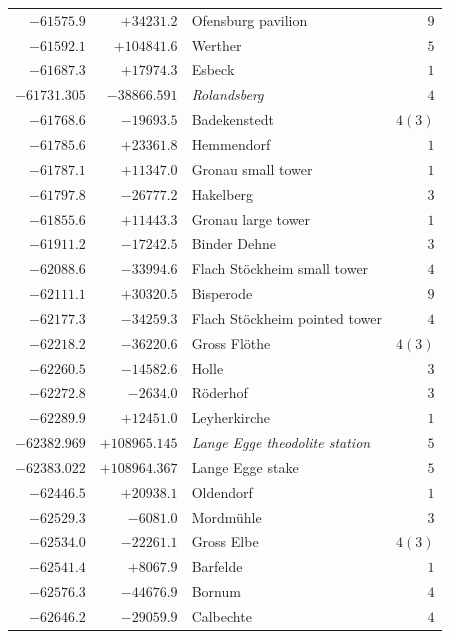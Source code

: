 \begin{center}
\begin{tabular}{r|r|p{170pt}|r}
\(-61575.9\)&\(+34231.2\)&Ofensburg pavilion&\(9\)\\
\(-61592.1\)&\(+104841.6\)&Werther&\(5\)\\
\(-61687.3\)&\(+17974.3\)&Esbeck&\(1\)\\
\(-61731.305\)&\(-38866.591\)&\textit{Rolandsberg}&\(4\)\\
\(-61768.6\)&\(-19693.5\)&Badekenstedt&\(4 (3)\)\\
\(-61785.6\)&\(+23361.8\)&Hemmendorf&\(1\)\\
\(-61787.1\)&\(+11347.0\)&Gronau small tower&\(1\)\\
\(-61797.8\)&\(-26777.2\)&Hakelberg&\(3\)\\
\(-61855.6\)&\(+11443.3\)&Gronau large tower&\(1\)\\
\(-61911.2\)&\(-17242.5\)&Binder Dehne&\(3\)\\
\(-62088.6\)&\(-33994.6\)&Flach Stöckheim small tower&\(4\)\\
\(-62111.1\)&\(+30320.5\)&Bisperode&\(9\)\\
\(-62177.3\)&\(-34259.3\)&Flach Stöckheim pointed tower&\(4\)\\
\(-62218.2\)&\(-36220.6\)&Gross Flöthe&\(4 (3)\)\\
\(-62260.5\)&\(-14582.6\)&Holle&\(3\)\\
\(-62272.8\)&\(-2634.0\)&Röderhof&\(3\)\\
\(-62289.9\)&\(+12451.0\)&Leyherkirche&\(1\)\\
\(-62382.969\)&\(+108965.145\)&\textit{Lange Egge theodolite station}&\(5\)\\
\(-62383.022\)&\(+108964.367\)&Lange Egge stake&\(5\)\\
\(-62446.5\)&\(+20938.1\)&Oldendorf&\(1\)\\
\(-62529.3\)&\(-6081.0\)&Mordmühle&\(3\)\\
\(-62534.0\)&\(-22261.1\)&Gross Elbe&\(4 (3)\)\\
\(-62541.4\)&\(+8067.9\)&Barfelde&\(1\)\\
\(-62576.3\)&\(-44676.9\)&Bornum&\(4\)\\
\(-62646.2\)&\(-29059.9\)&Calbechte&\(4\)\\
\hline\end{tabular}\endgroup\end{center}
